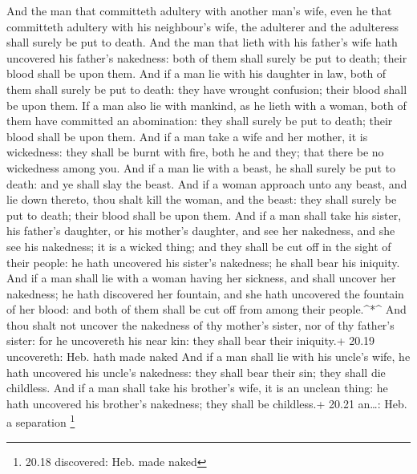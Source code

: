  And the man that committeth adultery with another man's
wife, even he that committeth adultery with his neighbour's wife, the
adulterer and the adulteress shall surely be put to death. 
And the man that lieth with his father's wife hath uncovered his
father's nakedness: both of them shall surely be put to death; their
blood shall be upon them.  And if a man lie with his
daughter in law, both of them shall surely be put to death: they have
wrought confusion; their blood shall be upon them.  If a
man also lie with mankind, as he lieth with a woman, both of them have
committed an abomination: they shall surely be put to death; their blood
shall be upon them.  And if a man take a wife and her
mother, it is wickedness: they shall be burnt with fire, both he and
they; that there be no wickedness among you.  And if a man
lie with a beast, he shall surely be put to death: and ye shall slay the
beast.  And if a woman approach unto any beast, and lie
down thereto, thou shalt kill the woman, and the beast: they shall
surely be put to death; their blood shall be upon them. 
And if a man shall take his sister, his father's daughter, or his
mother's daughter, and see her nakedness, and she see his nakedness; it
is a wicked thing; and they shall be cut off in the sight of their
people: he hath uncovered his sister's nakedness; he shall bear his
iniquity.  And if a man shall lie with a woman having her
sickness, and shall uncover her nakedness; he hath discovered her
fountain, and she hath uncovered the fountain of her blood: and both of
them shall be cut off from among their people.\^{}*\^{} 
And thou shalt not uncover the nakedness of thy mother's sister, nor of
thy father's sister: for he uncovereth his near kin: they shall bear
their iniquity.+ 20.19 uncovereth: Heb. hath made naked 
And if a man shall lie with his uncle's wife, he hath uncovered his
uncle's nakedness: they shall bear their sin; they shall die childless.
 And if a man shall take his brother's wife, it is an
unclean thing: he hath uncovered his brother's nakedness; they shall be
childless.+ 20.21 an\ldots: Heb. a separation \footnote{20.18
  discovered: Heb. made naked}

